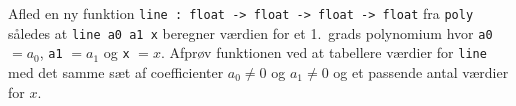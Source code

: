 \label{line} Afled en ny funktion \lstinline{line : float -> float -> float -> float} fra \lstinline{poly} således at \lstinline{line a0 a1 x} beregner værdien for et 1.\ grads polynomium hvor \lstinline{a0} $=a_0$, \lstinline{a1} $=a_1$ og \lstinline{x} $=x$. Afprøv funktionen ved at tabellere værdier for \lstinline{line} med det samme sæt af coefficienter $a_0\neq 0$ og $a_1\neq 0$ og et passende antal værdier for $x$.

